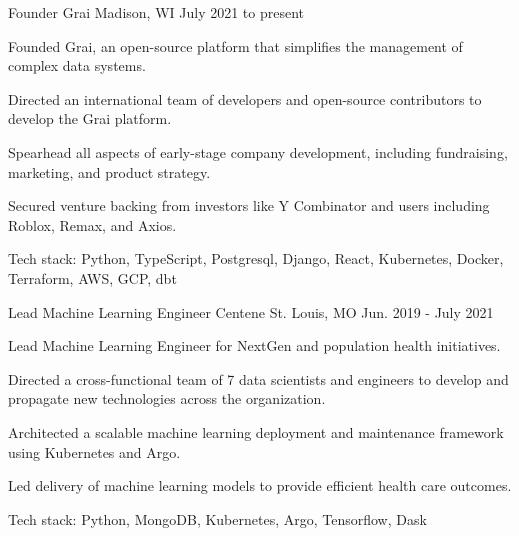 

\begin{cventries}
  \cventry
    {Founder} %
    {Grai} %
    {Madison, WI} %
    {July 2021 to present} %
    {
      \begin{cvitems} %
        \item {Founded Grai, an open-source platform that simplifies the management of complex data systems.}
        \item {Directed an international team of developers and open-source contributors to develop the Grai platform.}
        \item {Spearhead all aspects of early-stage company development, including fundraising, marketing, and product strategy.}
        \item {Secured venture backing from investors like Y Combinator and users including Roblox, Remax, and Axios.}
        \item {Tech stack: Python, TypeScript, Postgresql, Django, React, Kubernetes, Docker, Terraform, AWS, GCP, dbt}
      \end{cvitems}
    }

  \cventry
    {Lead Machine Learning Engineer} %
    {Centene} %
    {St. Louis, MO} %
    {Jun. 2019 - July 2021} %
    {
      \begin{cvitems} %
        \item {Lead Machine Learning Engineer for NextGen and population health initiatives.}
        \item {Directed a cross-functional team of 7 data scientists and engineers to develop and propagate new technologies across the organization.}
        \item {Architected a scalable machine learning deployment and maintenance framework using Kubernetes and Argo.}
        \item {Led delivery of machine learning models to provide efficient health care outcomes.}
        \item {Tech stack: Python, MongoDB, Kubernetes, Argo, Tensorflow, Dask}
      \end{cvitems}
    }


\end{cventries}
